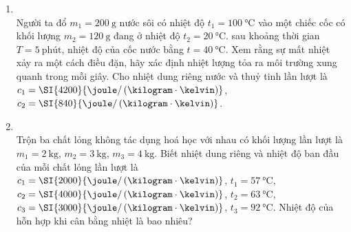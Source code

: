 \begin{enumerate}[label=\bfseries Câu \arabic*:, leftmargin=1.7cm]
\item {}\\
Người ta đổ $m_1 =\SI{200}{\gram}$ nước sôi có nhiệt độ $t_1 =\SI{100}{\celsius}$ vào một chiếc cốc có khối lượng $m_2 = \SI{120}{\gram}$ đang ở nhiệt độ $t_2 =\SI{20}{\celsius}$. sau khoảng thời gian $T = \SI{5}{\text{phút}}$, nhiệt độ của cốc nước bằng $t=\SI{40}{\celsius}$. Xem rằng sự mất nhiệt xảy ra một cách điều đặn, hãy xác định nhiệt lượng tỏa ra môi trường xung quanh trong mỗi giây. Cho nhiệt dung riêng nước và thuỷ tinh lần lượt là $c_1=\SI{4200}{\joule/\left(\kilogram\cdot\kelvin\right)}$, $c_2=\SI{840}{\joule/\left(\kilogram\cdot\kelvin\right)}$.

\item {}\\
Trộn ba chất lỏng không tác dụng hoá học với nhau có khối lượng lần lượt là $m_1=\SI{2}{\kilogram}$, $m_2=\SI{3}{\kilogram}$, $m_3=\SI{4}{\kilogram}$. Biết nhiệt dung riêng và nhiệt độ ban đầu của mỗi chất lỏng lần lượt là $c_1=\SI{2000}{\joule/\left(\kilogram\cdot\kelvin\right)}$, $t_1=\SI{57}{\celsius}$, $c_2=\SI{4000}{\joule/\left(\kilogram\cdot\kelvin\right)}$, $t_2=\SI{63}{\celsius}$, $c_3=\SI{3000}{\joule/\left(\kilogram\cdot\kelvin\right)}$, $t_3=\SI{92}{\celsius}$. Nhiệt độ của hỗn hợp khi cân bằng nhiệt là bao nhiêu?


\end{enumerate}
